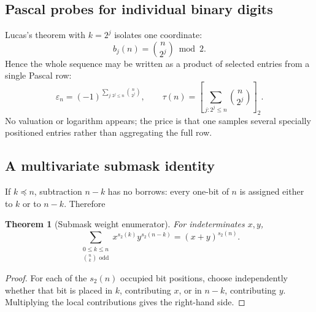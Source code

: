 \documentclass[11pt,oneside]{article}
\newtheorem{theorem}{Theorem}[section]
\theoremstyle{definition}
\theoremstyle{remark}
\newcommand{\bitsum}{s_2}
\newcommand{\eps}{\varepsilon}
\newcommand{\res}[2]{\left[#1\right]_{#2}}
\newcommand{\submask}{\preccurlyeq}
\begin{document}
\subsection{Pascal probes for individual binary digits}

Lucas's theorem with \(k=2^j\) isolates one coordinate:
\begin{equation}
  b_j(n)=\binom{n}{2^j}\bmod2.
  \label{eq:lucas-bit-probe}
\end{equation}
Hence the whole sequence may be written as a product of selected entries from
a single Pascal row:
\begin{equation}
  \boxed{
  \eps_n=(-1)^{\displaystyle\sum_{j:2^j\le n}\binom{n}{2^j}},
  \qquad
  \tau(n)=\res{\displaystyle\sum_{j:2^j\le n}\binom{n}{2^j}}{2}.}
  \label{eq:pascal-bit-probes}
\end{equation}
No valuation or logarithm appears; the price is that one samples several
specially positioned entries rather than aggregating the full row.

\subsection{A multivariate submask identity}
\label{sec:submask-identity}

If \(k\submask n\), subtraction \(n-k\) has no borrows: every one-bit of
\(n\) is assigned either to \(k\) or to \(n-k\).  Therefore
\begin{theorem}[Submask weight enumerator]
For indeterminates \(x,y\),
\begin{equation}
  \sum_{\substack{0\le k\le n\\\binom nk\text{ odd}}}
     x^{\bitsum(k)}y^{\bitsum(n-k)}
   =(x+y)^{\bitsum(n)}.
  \label{eq:submask-weight-enumerator}
\end{equation}
\end{theorem}

\begin{proof}
For each of the \(\bitsum(n)\) occupied bit positions, choose independently
whether that bit is placed in \(k\), contributing \(x\), or in \(n-k\),
contributing \(y\).  Multiplying the local contributions gives the right-hand
side.
\end{proof}
\end{document}
